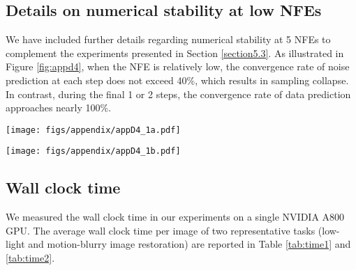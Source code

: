 \newpage


\subsection{Details on numerical stability at low NFEs}
\label{appd4}

We have included further details regarding numerical stability at 5 NFEs to complement the experiments presented in Section \ref{section5.3}. As illustrated in Figure \ref{fig:appd4}, when the NFE is relatively low, the convergence rate of noise prediction at each step does not exceed 40\%, which results in sampling collapse. In contrast, during the final 1 or 2 steps, the convergence rate of data prediction approaches nearly 100\%.

\begin{figure*}[ht]
    \centering
    \begin{minipage}[t]{0.35\linewidth}
        \centering
        \texttt{[image: figs/appendix/appD4\_1a.pdf]} %
        \label{fig:appd4(a)}
    \end{minipage}
    \begin{minipage}[t]{0.45\linewidth}
        \centering
        \texttt{[image: figs/appendix/appD4\_1b.pdf]} %
        \label{fig:appd4(b)}
    \end{minipage}
    \caption{\textbf{Convergence of noise prediction and data prediction at 5 NFEs.} In (a), we choose a stained image for example. The numbers in parentheses indicate the NFE. In (b), we illustrate the ratio of components of neural network output that satisfy the Taylor expansion convergence requirement.}
    \label{fig:appd4}
\end{figure*}


\subsection{Wall clock time}
\label{appd5}

We measured the wall clock time in our experiments on a single NVIDIA A800 GPU. The average wall clock time per image of two representative tasks (low-light and motion-blurry image restoration) are reported in Table \ref{tab:time1} and \ref{tab:time2}.

